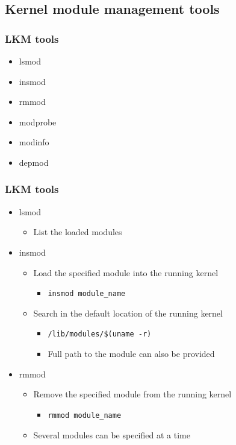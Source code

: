 \documentclass{beamer}
\begin{document}

\subsection{Kernel module management tools}

\begin{frame}
\frametitle{LKM tools}

\begin{itemize}
\item lsmod
\item insmod
\item rmmod
\item modprobe
\item modinfo
\item depmod
\end{itemize}

\end{frame}



\begin{frame}
\frametitle{LKM tools}

\begin{itemize}

\item lsmod
   \begin{itemize}
   \item List the loaded modules
   \end{itemize}

\item insmod 
   \begin{itemize}
   \item Load the specified module into the running kernel
     \begin{itemize}
     \item \texttt{insmod module\_name} 
     \end{itemize}
   \item Search in the default location of the running kernel
     \begin{itemize}
     \item \texttt{/lib/modules/\$(uname -r)}
     \item Full path to the module can also be provided
     \end{itemize}
   \end{itemize}

\item rmmod 
   \begin{itemize}
   \item Remove the specified module from the running kernel
   \begin{itemize}
     \item \texttt{rmmod module\_name} 
   \end{itemize}
   \item Several modules can be specified at a time
   \end{itemize}

\end{itemize}

\end{frame}
\end{document}

